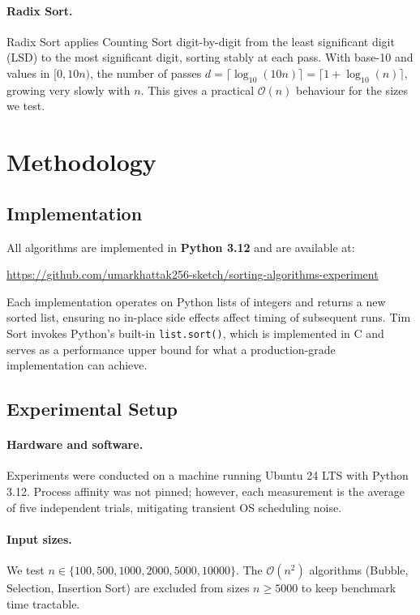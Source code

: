 \documentclass[11pt,a4paper]{article}
\begin{document}
\paragraph{Radix Sort.}
Radix Sort applies Counting Sort digit-by-digit from the least significant digit (LSD)
to the most significant digit, sorting stably at each pass. With base-10 and values
in $[0, 10n)$, the number of passes $d = \lceil \log_{10}(10n) \rceil = \lceil 1 + \log_{10}(n) \rceil$,
growing very slowly with $n$. This gives a practical $\mathcal{O}(n)$ behaviour for
the sizes we test.

\section{Methodology}
\label{sec:methodology}

\subsection{Implementation}

All algorithms are implemented in \textbf{Python 3.12} and are available at:
\begin{center}
\url{https://github.com/umarkhattak256-sketch/sorting-algorithms-experiment}
\end{center}
Each implementation operates on Python lists of integers and returns a new sorted list,
ensuring no in-place side effects affect timing of subsequent runs. Tim Sort invokes
Python's built-in \texttt{list.sort()}, which is implemented in C and serves as a
performance upper bound for what a production-grade implementation can achieve.

\subsection{Experimental Setup}

\paragraph{Hardware and software.}
Experiments were conducted on a machine running Ubuntu 24 LTS with Python 3.12.
Process affinity was not pinned; however, each measurement is the average of five
independent trials, mitigating transient OS scheduling noise.

\paragraph{Input sizes.}
We test $n \in \{100, 500, 1000, 2000, 5000, 10000\}$.
The $\mathcal{O}(n^2)$ algorithms (Bubble, Selection, Insertion Sort) are excluded from
sizes $n \geq 5000$ to keep benchmark time tractable.
\end{document}

